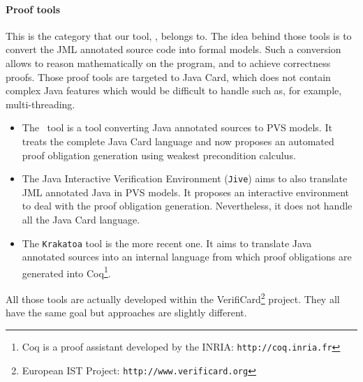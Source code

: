 \paragraph{Proof tools} This is the category that our tool, \JACK,
 belongs to. The idea behind those tools is to convert the JML
annotated source code into formal models.  Such a conversion allows to
reason mathematically on the program, and to achieve correctness
proofs.  Those proof tools are targeted to Java Card, which does not
contain complex Java features which would be difficult to handle such
as, for example, multi-threading.
\begin{itemize}
 \item The \LOOP\ tool \cite{Jacobs:2001:LJM,Huisman:2000:JPV,denJac01}
 is a tool converting Java annotated sources to PVS models.  It treats
 the complete Java Card language and now proposes an automated proof
 obligation generation using weakest precondition calculus.
 \item The Java Interactive Verification Environment (\texttt{Jive})
 \cite{MeyerP00} aims to also translate JML
 annotated Java in PVS models.  It proposes an interactive environment to
 deal with the proof obligation generation.  Nevertheless, it does not
 handle all the Java Card language.
\item The \texttt{Krakatoa} tool \cite{krakatoa} is the more recent
 one. It aims to translate Java annotated sources into an internal
 language from which proof obligations are generated into Coq\footnote{Coq is a proof assistant developed by the INRIA: \texttt{http://coq.inria.fr}}.
\end{itemize}
 All those tools are actually developed within the VerifiCard\footnote{European IST Project: \texttt{http://www.verificard.org}} project.
 They all have the same goal but approaches are slightly different.

